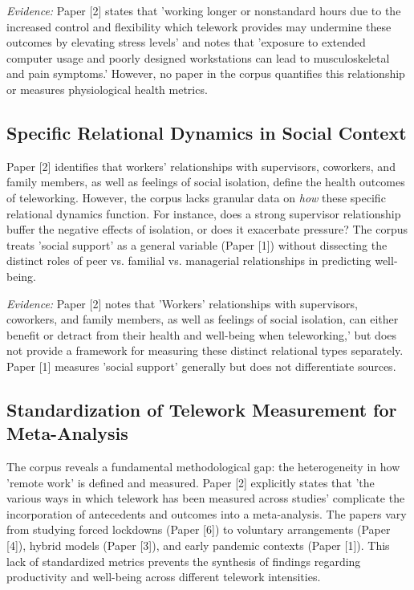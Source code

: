\documentclass[11pt]{article}
\begin{document}
\textit{Evidence:} Paper [2] states that 'working longer or nonstandard hours due to the increased control and flexibility which telework provides may undermine these outcomes by elevating stress levels' and notes that 'exposure to extended computer usage and poorly designed workstations can lead to musculoskeletal and pain symptoms.' However, no paper in the corpus quantifies this relationship or measures physiological health metrics.

\subsection{Specific Relational Dynamics in Social Context}
Paper [2] identifies that workers' relationships with supervisors, coworkers, and family members, as well as feelings of social isolation, define the health outcomes of teleworking. However, the corpus lacks granular data on \textit{how} these specific relational dynamics function. For instance, does a strong supervisor relationship buffer the negative effects of isolation, or does it exacerbate pressure? The corpus treats 'social support' as a general variable (Paper [1]) without dissecting the distinct roles of peer vs. familial vs. managerial relationships in predicting well-being.

\textit{Evidence:} Paper [2] notes that 'Workers' relationships with supervisors, coworkers, and family members, as well as feelings of social isolation, can either benefit or detract from their health and well-being when teleworking,' but does not provide a framework for measuring these distinct relational types separately. Paper [1] measures 'social support' generally but does not differentiate sources.

\subsection{Standardization of Telework Measurement for Meta-Analysis}
The corpus reveals a fundamental methodological gap: the heterogeneity in how 'remote work' is defined and measured. Paper [2] explicitly states that 'the various ways in which telework has been measured across studies' complicate the incorporation of antecedents and outcomes into a meta-analysis. The papers vary from studying forced lockdowns (Paper [6]) to voluntary arrangements (Paper [4]), hybrid models (Paper [3]), and early pandemic contexts (Paper [1]). This lack of standardized metrics prevents the synthesis of findings regarding productivity and well-being across different telework intensities.
\end{document}
